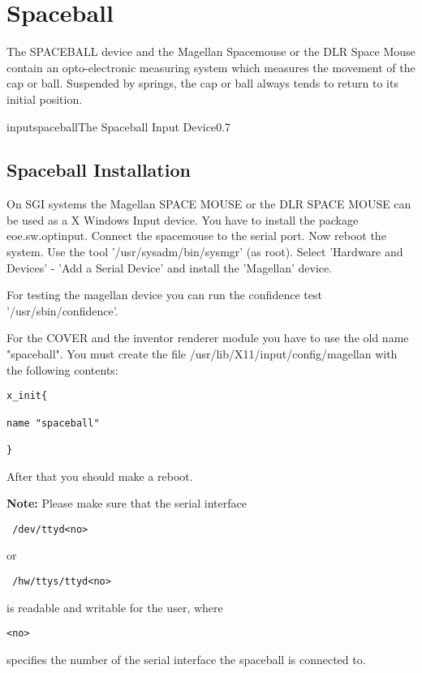 
\section{Spaceball}
The SPACEBALL device and the Magellan Spacemouse or the DLR Space Mouse 
contain an opto-electronic measuring system which
measures the movement of the cap or ball. 
Suspended by springs, the cap or ball always tends to return 
to its initial position.

\begin{covimg}{input}{spaceball}{The Spaceball Input Device}{0.7}\end{covimg}

\subsection{Spaceball Installation}
On SGI systems the Magellan SPACE MOUSE or the DLR SPACE MOUSE can be used 
as a X Windows Input device.
You have to install the package eoe.sw.optinput. Connect the spacemouse to the serial port.
Now reboot the system.
Use the tool 
'/usr/sysadm/bin/sysmgr' (as root). 
Select 'Hardware and Devices' - 'Add a Serial Device' and install 
the 'Magellan' device.

For testing the magellan device you can run the confidence 
test '/usr/sbin/confidence'.

For the COVER and the inventor renderer module you have to use the 
old name "spaceball".
You must create the file /usr/lib/X11/input/config/magellan with the following 
contents:

\small \begin{verbatim}
x_init{

name "spaceball"

}
\end{verbatim} \normalsize

After that you should make a reboot.

{\bf Note:} Please make sure that the serial interface
\small \begin{verbatim} /dev/ttyd<no> \end{verbatim} \normalsize or 
\small \begin{verbatim} /hw/ttys/ttyd<no>\end{verbatim} \normalsize 
is readable and writable for the user, where \small \begin{verbatim}<no>\end{verbatim} \normalsize specifies the number of
the serial interface the spaceball is connected to.


